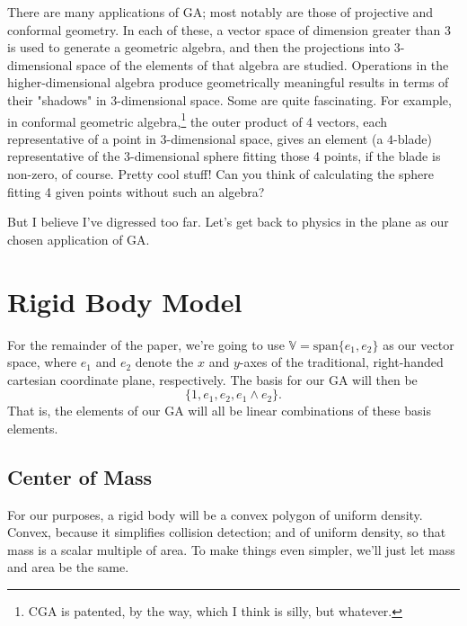 \documentclass[12pt]{article}
\newcommand{\V}{\mathbb{V}}
\begin{document}
There are many applications of GA; most notably are those of projective and conformal geometry.
In each of these, a vector space of dimension greater than 3 is used to generate a geometric
algebra, and then the projections into 3-dimensional space of the elements of that algebra are studied.
Operations in the higher-dimensional algebra produce geometrically meaningful results in terms of their
"shadows" in 3-dimensional space.  Some are quite fascinating.  For example, in conformal geometric
algebra,\footnote{CGA is patented, by the way, which I think is silly, but whatever.} the outer
product of 4 vectors, each representative of a point in 3-dimensional space, gives an element (a $4$-blade)
representative of the 3-dimensional sphere fitting those 4 points, if the blade is non-zero, of course.
Pretty cool stuff!  Can you think of calculating the sphere fitting 4 given points without such an algebra?

But I believe I've digressed too far.  Let's get back to physics in the plane as
our chosen application of GA.

\section{Rigid Body Model}

For the remainder of the paper, we're going to use $\V=\mbox{span}\{e_1,e_2\}$ as our vector space, where $e_1$ and
$e_2$ denote the $x$ and $y$-axes of the traditional, right-handed cartesian coordinate plane, respectively.  The basis for our GA will
then be
\begin{equation}
\{1,e_1,e_2,e_1\wedge e_2\}.
\end{equation}
That is, the elements of our GA will all be linear combinations of these basis elements.

\subsection{Center of Mass}

For our purposes, a rigid body will be a convex polygon of uniform density.  Convex, because it simplifies collision detection;
and of uniform density, so that mass is a scalar multiple of area.  To make things even simpler, we'll just let mass and area
be the same.
\end{document}
